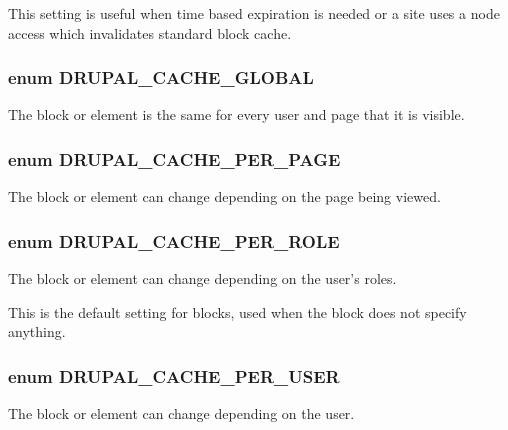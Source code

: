 This setting is useful when time based expiration is needed or a site uses a node access which invalidates standard block cache. \hypertarget{group__block__caching_gae81ef75e407d08488a85f2b396292ce2}{
\subsubsection[{DRUPAL\_\-CACHE\_\-GLOBAL}]{\setlength{\rightskip}{0pt plus 5cm}enum {\bf DRUPAL\_\-CACHE\_\-GLOBAL}}}
\label{group__block__caching_gae81ef75e407d08488a85f2b396292ce2}
The block or element is the same for every user and page that it is visible. \hypertarget{group__block__caching_gaf5ec7d2a686e7bf3be4cb308bdbe81cc}{
\subsubsection[{DRUPAL\_\-CACHE\_\-PER\_\-PAGE}]{\setlength{\rightskip}{0pt plus 5cm}enum {\bf DRUPAL\_\-CACHE\_\-PER\_\-PAGE}}}
\label{group__block__caching_gaf5ec7d2a686e7bf3be4cb308bdbe81cc}
The block or element can change depending on the page being viewed. \hypertarget{group__block__caching_ga43d498e9607c4cdeb88d89341e0b3c3c}{
\subsubsection[{DRUPAL\_\-CACHE\_\-PER\_\-ROLE}]{\setlength{\rightskip}{0pt plus 5cm}enum {\bf DRUPAL\_\-CACHE\_\-PER\_\-ROLE}}}
\label{group__block__caching_ga43d498e9607c4cdeb88d89341e0b3c3c}
The block or element can change depending on the user's roles.

This is the default setting for blocks, used when the block does not specify anything. \hypertarget{group__block__caching_gaa50d399158badf0cda6ecbc3ff6707e9}{
\subsubsection[{DRUPAL\_\-CACHE\_\-PER\_\-USER}]{\setlength{\rightskip}{0pt plus 5cm}enum {\bf DRUPAL\_\-CACHE\_\-PER\_\-USER}}}
\label{group__block__caching_gaa50d399158badf0cda6ecbc3ff6707e9}
The block or element can change depending on the user.

